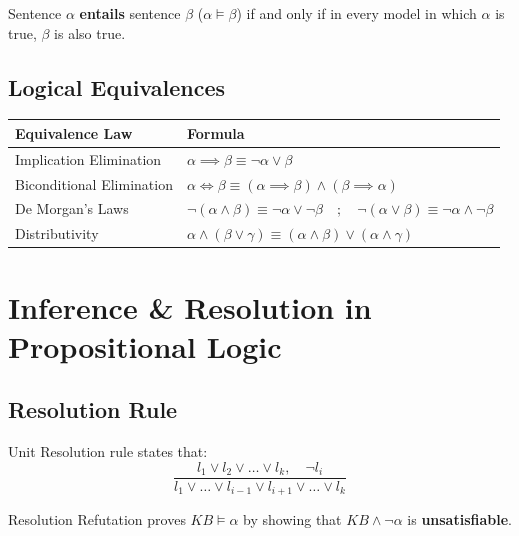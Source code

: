 \documentclass[12pt,a4paper]{article}
\renewcommand{\arraystretch}{1.45}
\begin{document}
\begin{tcolorbox}[defbox, title={Logical Entailment}]
  Sentence $\alpha$ \textbf{entails} sentence $\beta$ ($\alpha \models \beta$) if and only if in every model in which $\alpha$ is true, $\beta$ is also true.
\end{tcolorbox}

\subsection{Logical Equivalences}
\par\vspace{6pt}\noindent
{\renewcommand{\arraystretch}{1.4}%
\begin{tabularx}{\linewidth}{|B{3.5cm}|Y|}
\hline
\textbf{Equivalence Law} & \textbf{Formula} \\
\hline
Implication Elimination & $\alpha \implies \beta \equiv \neg \alpha \lor \beta$ \\
\hline
Biconditional Elimination & $\alpha \iff \beta \equiv (\alpha \implies \beta) \land (\beta \implies \alpha)$ \\
\hline
De Morgan's Laws & $\neg(\alpha \land \beta) \equiv \neg \alpha \lor \neg \beta \quad ; \quad \neg(\alpha \lor \beta) \equiv \neg \alpha \land \neg \beta$ \\
\hline
Distributivity & $\alpha \land (\beta \lor \gamma) \equiv (\alpha \land \beta) \lor (\alpha \land \gamma)$ \\
\hline
\end{tabularx}}

\section{Inference \& Resolution in Propositional Logic}

\subsection{Resolution Rule}
Unit Resolution rule states that:
\begin{equation}
  \frac{l_1 \lor l_2 \lor \dots \lor l_k, \quad \neg l_i}{l_1 \lor \dots \lor l_{i-1} \lor l_{i+1} \lor \dots \lor l_k}
\end{equation}

Resolution Refutation proves $KB \models \alpha$ by showing that $KB \land \neg \alpha$ is \textbf{unsatisfiable}.
\end{document}
